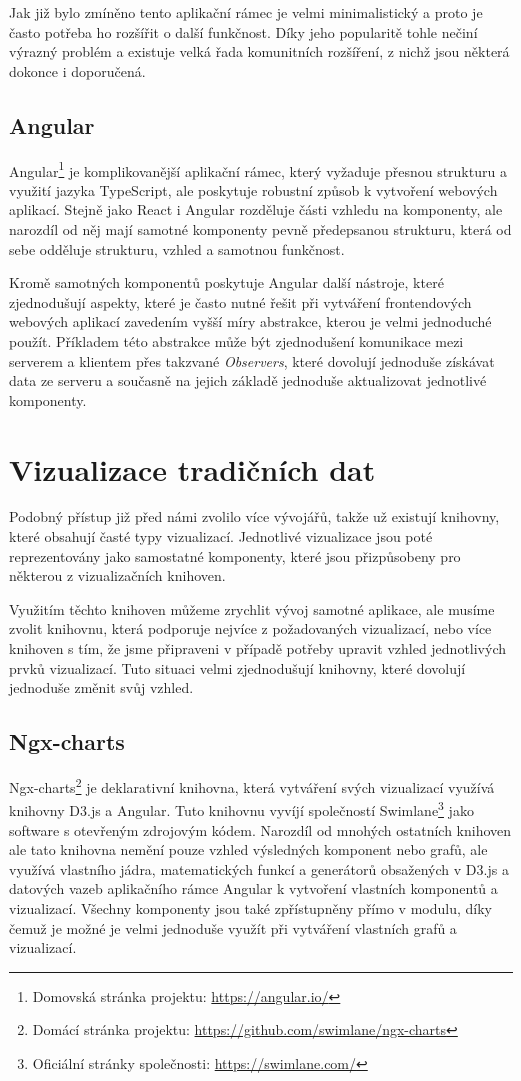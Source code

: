 Jak již bylo zmíněno tento aplikační rámec je velmi minimalistický a proto je často potřeba ho rozšířit o další funkčnost. Díky jeho popularitě tohle nečiní výrazný problém a existuje velká řada komunitních rozšíření, z nichž jsou některá dokonce i doporučená.

\subsection*{Angular}

Angular\footnote{Domovská stránka projektu: \url{https://angular.io/}} je komplikovanější aplikační rámec, který vyžaduje přesnou strukturu a využití jazyka TypeScript, ale poskytuje robustní způsob k vytvoření webových aplikací. Stejně jako React i Angular rozděluje části vzhledu na komponenty, ale narozdíl od něj mají samotné komponenty pevně předepsanou strukturu, která od sebe odděluje strukturu, vzhled a samotnou funkčnost. 

Kromě samotných komponentů poskytuje Angular další nástroje, které zjednodušují aspekty, které je často nutné řešit při vytváření frontendových webových aplikací zavedením vyšší míry abstrakce, kterou je velmi jednoduché použít. Příkladem této abstrakce může být zjednodušení komunikace mezi serverem a klientem přes takzvané \textit{Observers}, které dovolují jednoduše získávat data ze serveru a současně na jejich základě jednoduše aktualizovat jednotlivé komponenty.

\section{Vizualizace tradičních dat}
Podobný přístup již před námi zvolilo více vývojářů, takže už existují knihovny, které obsahují časté typy vizualizací. Jednotlivé vizualizace jsou poté reprezentovány jako samostatné komponenty, které jsou přizpůsobeny pro některou z vizualizačních knihoven. 

Využitím těchto knihoven můžeme zrychlit vývoj samotné aplikace, ale musíme zvolit knihovnu, která podporuje nejvíce z požadovaných vizualizací, nebo více knihoven s tím, že jsme připraveni v případě potřeby upravit vzhled jednotlivých prvků vizualizací. Tuto situaci velmi zjednodušují knihovny, které dovolují jednoduše změnit svůj vzhled.

\subsection*{Ngx-charts}
Ngx-charts\footnote{Domácí stránka projektu: \url{https://github.com/swimlane/ngx-charts}} je deklarativní knihovna, která vytváření svých vizualizací využívá knihovny D3.js a Angular. Tuto knihovnu vyvíjí společností Swimlane\footnote{Oficiální stránky společnosti: \url{https://swimlane.com/}} jako software s otevřeným zdrojovým kódem. Narozdíl od mnohých ostatních knihoven ale tato knihovna nemění pouze vzhled výsledných komponent nebo grafů, ale využívá vlastního jádra, matematických funkcí a generátorů obsažených v D3.js a datových vazeb aplikačního rámce Angular k vytvoření vlastních komponentů a vizualizací. Všechny komponenty jsou také zpřístupněny přímo v modulu, díky čemuž je možné je velmi jednoduše využít při vytváření vlastních grafů a vizualizací.


